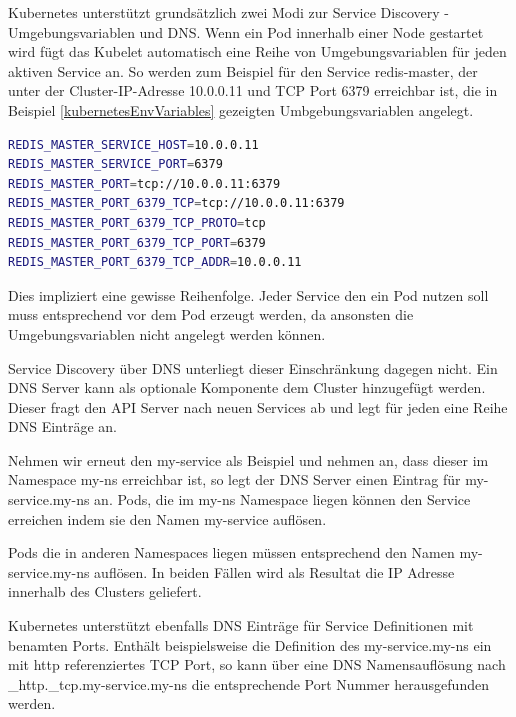 Kubernetes unterstützt grundsätzlich zwei Modi zur Service Discovery - Umgebungsvariablen und DNS.
Wenn ein Pod innerhalb einer Node gestartet wird fügt das Kubelet automatisch eine Reihe von Umgebungsvariablen für jeden aktiven Service an.
So werden zum Beispiel für den Service \glqq{}redis-master\grqq{}, der unter der Cluster-IP-Adresse 10.0.0.11 und TCP Port 6379 erreichbar ist, die in Beispiel \ref{kubernetesEnvVariables} gezeigten Umbgebungsvariablen angelegt.

\begin{minipage}{\linewidth}
\begin{lstlisting}[frame=single,caption=Umgebungsvariablen für Service ``redis-master``, label=kubernetesEnvVariables, language=bash]
REDIS_MASTER_SERVICE_HOST=10.0.0.11
REDIS_MASTER_SERVICE_PORT=6379
REDIS_MASTER_PORT=tcp://10.0.0.11:6379
REDIS_MASTER_PORT_6379_TCP=tcp://10.0.0.11:6379
REDIS_MASTER_PORT_6379_TCP_PROTO=tcp
REDIS_MASTER_PORT_6379_TCP_PORT=6379
REDIS_MASTER_PORT_6379_TCP_ADDR=10.0.0.11
\end{lstlisting}
\end{minipage}

Dies impliziert eine gewisse Reihenfolge.
Jeder Service den ein Pod nutzen soll muss entsprechend vor dem Pod erzeugt werden, da ansonsten die Umgebungsvariablen nicht angelegt werden können.

Service Discovery über DNS unterliegt dieser Einschränkung dagegen nicht.
Ein DNS Server kann als optionale Komponente dem Cluster hinzugefügt werden.
Dieser fragt den API Server nach neuen Services ab und legt für jeden eine Reihe DNS Einträge an.

Nehmen wir erneut den \glqq{}my-service\grqq{} als Beispiel und nehmen an, dass dieser im Namespace \glqq{}my-ns\grqq{} erreichbar ist, so legt der DNS Server einen Eintrag für \glqq{}my-service.my-ns\grqq{} an. 
Pods, die im \glqq{}my-ns\grqq{} Namespace liegen können den Service erreichen indem sie den Namen \glqq{}my-service\grqq{} auflösen.

Pods die in anderen Namespaces liegen müssen entsprechend den Namen \glqq{}my-service.my-ns\grqq{} auflösen.
In beiden Fällen wird als Resultat die IP Adresse innerhalb des Clusters geliefert.

Kubernetes unterstützt ebenfalls DNS Einträge für Service Definitionen mit benamten Ports.
Enthält beispielsweise die Definition des \glqq{}my-service.my-ns\grqq{} ein mit \glqq{}http\grqq{} referenziertes TCP Port, so kann über eine DNS Namensauflösung nach \glqq{}\_http.\_tcp.my-service.my-ns\grqq{} die entsprechende Port Nummer herausgefunden werden.

